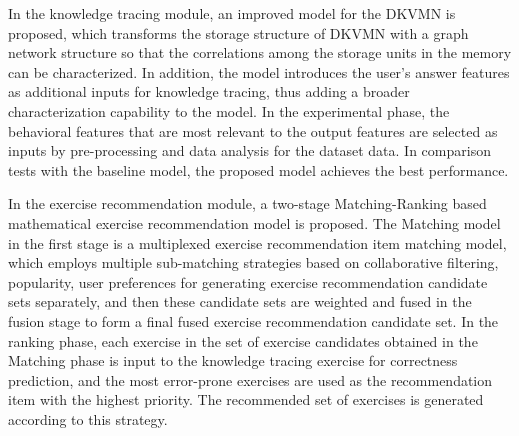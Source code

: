 In the knowledge tracing module, an improved model for the DKVMN is proposed, which transforms the storage structure of DKVMN with a graph network structure so that the correlations among the storage units in the memory can be characterized. In addition, the model introduces the user's answer features as additional inputs for knowledge tracing, thus adding a broader characterization capability to the model. In the experimental phase, the behavioral features that are most relevant to the output features are selected as inputs by pre-processing and data analysis for the dataset data. In comparison tests with the baseline model, the proposed model achieves the best performance.



In the exercise recommendation module, a two-stage Matching-Ranking based mathematical exercise recommendation model is proposed. The Matching model in the first stage is a multiplexed exercise recommendation item matching model, which employs multiple sub-matching strategies based on collaborative filtering, popularity, user preferences for generating exercise recommendation candidate sets separately, and then these candidate sets are weighted and fused in the fusion stage to form a final fused exercise recommendation candidate set. In the ranking phase, each exercise in the set of exercise candidates obtained in the Matching phase is input to the knowledge tracing exercise for correctness prediction, and the most error-prone exercises are used as the recommendation item with the highest priority. The recommended set of exercises is generated according to this strategy.


